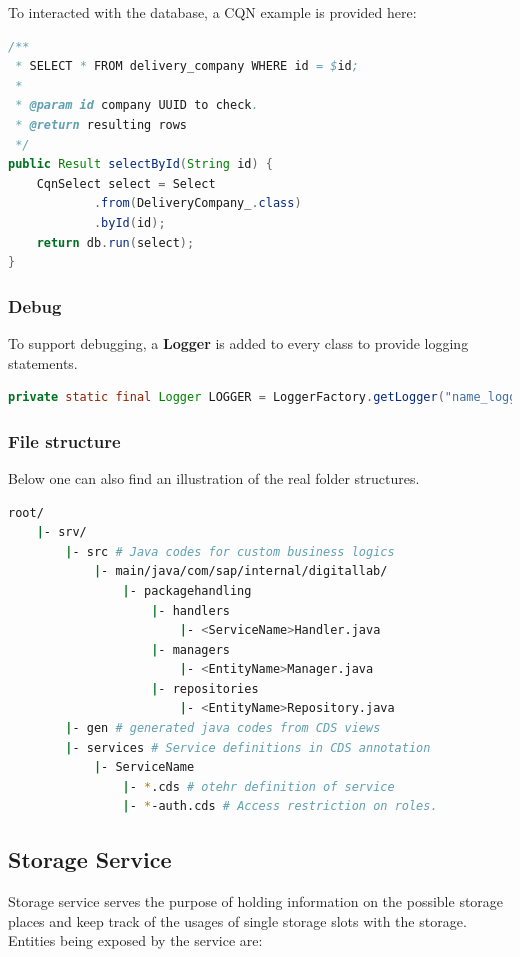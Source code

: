 To interacted with the database, a CQN example is provided here:

\begin{lstlisting}[language={java}]
/**
 * SELECT * FROM delivery_company WHERE id = $id;
 *
 * @param id company UUID to check.
 * @return resulting rows
 */
public Result selectById(String id) {
    CqnSelect select = Select
            .from(DeliveryCompany_.class)
            .byId(id);
    return db.run(select);
}
\end{lstlisting}

\subsubsection{Debug}

To support debugging, a \textbf{Logger} is added to every class to provide logging statements.

\begin{lstlisting}[language={java}]
 private static final Logger LOGGER = LoggerFactory.getLogger("name_logger");
\end{lstlisting}


\subsubsection{File structure}
Below one can also find an illustration of the real folder structures.

\begin{lstlisting}[language={bash}]
root/
    |- srv/
        |- src # Java codes for custom business logics
            |- main/java/com/sap/internal/digitallab/
                |- packagehandling
                    |- handlers
                        |- <ServiceName>Handler.java
                    |- managers
                        |- <EntityName>Manager.java
                    |- repositories
                        |- <EntityName>Repository.java
        |- gen # generated java codes from CDS views
        |- services # Service definitions in CDS annotation
            |- ServiceName 
                |- *.cds # otehr definition of service
                |- *-auth.cds # Access restriction on roles.
\end{lstlisting}

\subsection{Storage Service}
Storage service serves the purpose of holding information on the possible storage places and keep track of the usages of single storage slots with the storage. Entities being exposed by the service are:

